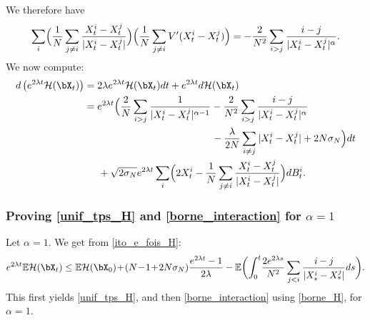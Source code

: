 We therefore have
\[
\sum_i\Bigl(\frac{1}{N}\sum_{j\neq i}\frac{X^i_t-X^j_t}{|X^i_t-X^j_t|}\Bigr)\Bigl(\frac{1}{N}\sum_{j\neq i}V'(X^i_t-X^j_t)\Bigr)=-\frac{2}{N^2}\sum_{i>j}\frac{i-j}{|X^i_t-X^j_t|^{\alpha}}.
\]
We now compute:
\begin{equation}\label{ito_e_fois_H}
\begin{aligned}
d\left(e^{2\lambda t}\mathcal{H}(\bX_t)\right)&=2\lambda e^{2\lambda t}\mathcal{H}(\bX_t)dt+e^{2\lambda t}d\mathcal{H}(\bX_t)\\
&=e^{2\lambda t}\Bigl(\frac{2}{N}\sum_{i>j}\frac{1}{|X^i_t-X^j_t|^{\alpha-1}}-\frac{2}{N^2}\sum_{i>j}\frac{i-j}{|X^i_t-X^j_t|^{\alpha}}\\
&\hspace*{4.5cm}-\frac{\lambda}{2N}\sum_{i\neq j}|X^i_t-X^j_t|+2N\sigma_N\Bigr)dt\\
&\hspace*{.5cm}+\sqrt{2\sigma_N}e^{2\lambda t}\sum_i\Bigl(2X^i_t-\frac{1}{N}\sum_{j\neq i}\frac{X^i_t-X^j_t}{|X^i_t-X^j_t|}\Bigr)dB^i_t.
\end{aligned}
\end{equation}

\subsubsection*{Proving \eqref{unif_tps_H} and \eqref{borne_interaction} for $\alpha=1$} Let $\alpha=1$. We get from \eqref{ito_e_fois_H}:
\begin{align*}
e^{2\lambda t}\mathbb{E}\mathcal{H}(\bX_t)\leq \mathbb{E}\mathcal{H}(\bX_0)\!+\!(N\!-\!1\!+\!2N\sigma_N)\frac{e^{2\lambda t}-1}{2\lambda}-\mathbb{E}\biggl(\int_0^t\!\frac{2e^{2\lambda s}}{N^2}\sum_{j<i}\frac{i-j}{|X^i_s-X^j_s|}ds\biggr).
\end{align*}
This first yields \eqref{unif_tps_H}, and then \eqref{borne_interaction} using \eqref{borne_H}, for $\alpha=1$.


